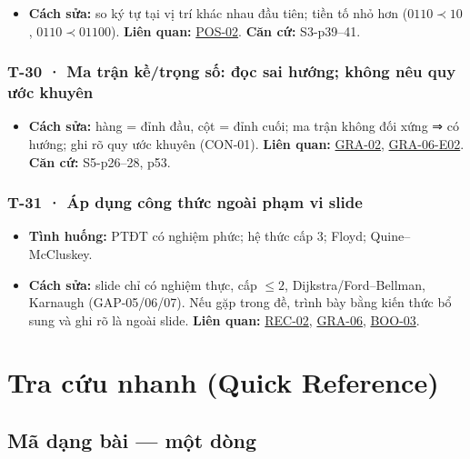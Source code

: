 \documentclass[
  10pt,
  twoside,openany]{book}
\providecommand{\tightlist}{%
  \setlength{\itemsep}{0pt}\setlength{\parskip}{0pt}}
\begin{document}
\begin{itemize}
\tightlist
\item
  \textbf{Cách sửa:} so ký tự tại vị trí khác nhau đầu tiên; tiền tố nhỏ
  hơn (\(0110\prec10\), \(0110\prec01100\)). \textbf{Liên quan:}
  \protect\hyperlink{POS-02}{POS-02}. \textbf{Căn cứ:} S3-p39--41.
\end{itemize}

\hypertarget{T-30}{%
\subsection{T-30 · Ma trận kề/trọng số: đọc sai hướng; không nêu quy ước
khuyên}\label{T-30}}

\begin{itemize}
\tightlist
\item
  \textbf{Cách sửa:} hàng = đỉnh đầu, cột = đỉnh cuối; ma trận không đối
  xứng ⇒ có hướng; ghi rõ quy ước khuyên (CON-01). \textbf{Liên quan:}
  \protect\hyperlink{GRA-02}{GRA-02},
  \protect\hyperlink{GRA-06-E02}{GRA-06-E02}. \textbf{Căn cứ:}
  S5-p26--28, p53.
\end{itemize}

\hypertarget{T-31}{%
\subsection{T-31 · Áp dụng công thức ngoài phạm vi slide}\label{T-31}}

\begin{itemize}
\tightlist
\item
  \textbf{Tình huống:} PTĐT có nghiệm phức; hệ thức cấp 3; Floyd;
  Quine--McCluskey.
\item
  \textbf{Cách sửa:} slide chỉ có nghiệm thực, cấp \(\le2\),
  Dijkstra/Ford--Bellman, Karnaugh (GAP-05/06/07). Nếu gặp trong đề,
  trình bày bằng kiến thức bổ sung và ghi rõ là ngoài slide.
  \textbf{Liên quan:} \protect\hyperlink{REC-02}{REC-02},
  \protect\hyperlink{GRA-06}{GRA-06},
  \protect\hyperlink{BOO-03}{BOO-03}.
\end{itemize}

\hypertarget{quickref}{%
\chapter{Tra cứu nhanh (Quick Reference)}\label{quickref}}

\hypertarget{muxe3-dux1ea1ng-buxe0i-mux1ed9t-duxf2ng}{%
\section{Mã dạng bài --- một
dòng}\label{muxe3-dux1ea1ng-buxe0i-mux1ed9t-duxf2ng}}
\end{document}
